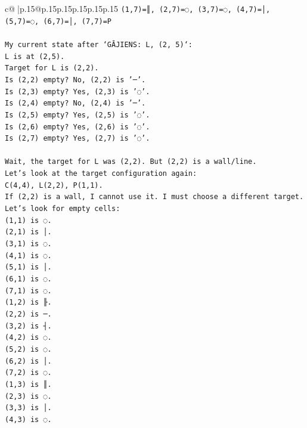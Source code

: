 \documentclass{article}
\begin{document}
{\begin{supertabular}{c@{$\;$}|p{.15\linewidth}@{}p{.15\linewidth}p{.15\linewidth}p{.15\linewidth}p{.15\linewidth}p{.15\linewidth}}
{{{\texttt{(1,7)=║, (2,7)=◌, (3,7)=◌, (4,7)=│, (5,7)=◌, (6,7)=│, (7,7)=P} \\
\\ 
\texttt{My current state after `GĀJIENS: L, (2, 5)`:} \\
\texttt{L is at (2,5).} \\
\texttt{Target for L is (2,2).} \\
\texttt{Is (2,2) empty? No, (2,2) is '─'.} \\
\texttt{Is (2,3) empty? Yes, (2,3) is '◌'.} \\
\texttt{Is (2,4) empty? No, (2,4) is '─'.} \\
\texttt{Is (2,5) empty? Yes, (2,5) is '◌'.} \\
\texttt{Is (2,6) empty? Yes, (2,6) is '◌'.} \\
\texttt{Is (2,7) empty? Yes, (2,7) is '◌'.} \\
\\ 
\texttt{Wait, the target for L was (2,2). But (2,2) is a wall/line.} \\
\texttt{Let's look at the target configuration again:} \\
\texttt{C(4,4), L(2,2), P(1,1).} \\
\texttt{If (2,2) is a wall, I cannot use it. I must choose a different target.} \\
\texttt{Let's look for empty cells:} \\
\texttt{(1,1) is ◌.} \\
\texttt{(2,1) is │.} \\
\texttt{(3,1) is ◌.} \\
\texttt{(4,1) is ◌.} \\
\texttt{(5,1) is │.} \\
\texttt{(6,1) is ◌.} \\
\texttt{(7,1) is ◌.} \\
\texttt{(1,2) is ╟.} \\
\texttt{(2,2) is ─.} \\
\texttt{(3,2) is ┤.} \\
\texttt{(4,2) is ◌.} \\
\texttt{(5,2) is ◌.} \\
\texttt{(6,2) is │.} \\
\texttt{(7,2) is ◌.} \\
\texttt{(1,3) is ║.} \\
\texttt{(2,3) is ◌.} \\
\texttt{(3,3) is │.} \\
\texttt{(4,3) is ◌.} \\
}}}
\end{supertabular}}
\end{document}
